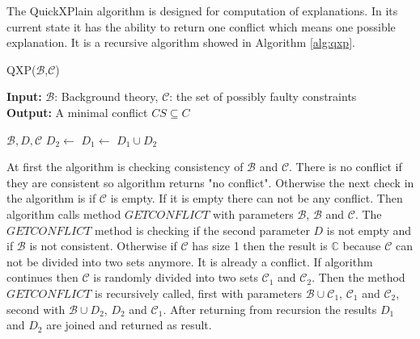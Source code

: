 \documentclass[12pt,a4paper]{article}
\begin{document}
The QuickXPlain algorithm is designed for computation of explanations. In its current state it has the ability to return one conflict which means one possible explanation. It is a recursive algorithm showed in Algorithm \ref{alg:qxp}.

\begin{algorithm}[H]
	\footnotesize
	\caption{QXP($\mathcal{B}$,$\mathcal{C}$)}
	\label{alg:qxp}
	\textbf{Input:} $\mathcal{B}$: Background theory, $\mathcal{C}$: the set of possibly faulty constraints  \\
	\textbf{Output:} A minimal conflict $CS \subseteq C$
	\begin{algorithmic}[1]
		\State {}
		\State \Return {$\emptyset$}
		\EndIf
		\State {}
		
		\medskip
		 {$\mathcal{B}, D, \mathcal{C}$}
		\State \Return {$\emptyset$}
		\EndIf
		\State {}
		\EndIf
		\State $D_{2} \gets$ 
		\State $D_{1} \gets$ 
		\State \Return $D_{1} \cup D_{2}$
		\EndFunction			
	\end{algorithmic}
\end{algorithm}

At first the algorithm is checking consistency of $\mathcal{B}$ and $\mathcal{C}$. There is no conflict if they are consistent so algorithm returns "no conflict". Otherwise the next check in the algorithm is if $\mathcal{C}$ is empty. If it is empty there can not be any conflict. Then algorithm calls method $\mathit{GETCONFLICT}$ with parameters $\mathcal{B}$, $\mathcal{B}$ and $\mathcal{C}$. The $\mathit{GETCONFLICT}$ method is checking if the second parameter $D$ is not empty and if $\mathcal{B}$ is not consistent. Otherwise if $\mathcal{C}$ has size 1 then the result is $\mathbb{C}$ because $\mathcal{C}$ can not be divided into two sets anymore. It is already a conflict. If algorithm continues then $\mathcal{C}$ is randomly divided into two sets $\mathcal{C}_{1}$ and $\mathcal{C}_{2}$. Then the method $\mathit{GETCONFLICT}$ is recursively called, first with parameters $\mathcal{B} \cup \mathcal{C}_{1}$, $\mathcal{C}_{1}$ and $\mathcal{C_{2}}$, second with $\mathcal{B} \cup D_{2}$, $D_{2}$ and $\mathcal{C}_{1}$. After returning from recursion the results $D_{1}$ and $D_{2}$ are joined and returned as result.
\end{document}
